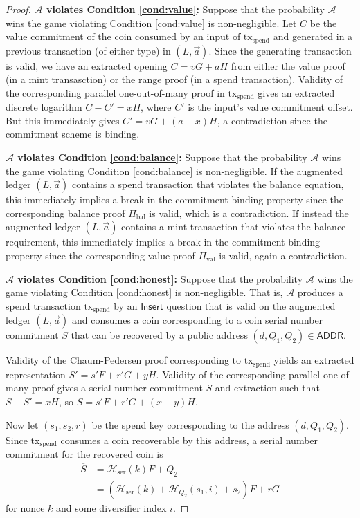 \documentclass{llncs}
\newcommand{\hash}{\mathcal{H}}
\newcommand{\func}[1]{\mathsf{#1}}
\begin{document}
\begin{proof}
\textbf{$\mathcal{A}$ violates Condition \ref{cond:value}:} Suppose that the probability $\mathcal{A}$ wins the game violating Condition \ref{cond:value} is non-negligible.
Let $C$ be the value commitment of the coin consumed by an input of $\text{tx}_{\text{spend}}$ and generated in a previous transaction (of either type) in $(L, \vec{a})$.
Since the generating transaction is valid, we have an extracted opening $C = vG + aH$ from either the value proof (in a mint transasction) or the range proof (in a spend transaction).
Validity of the corresponding parallel one-out-of-many proof in $\text{tx}_{\text{spend}}$ gives an extracted discrete logarithm $C - C' = xH$, where $C'$ is the input's value commitment offset.
But this immediately gives $C' = vG + (a - x)H$, a contradiction since the commitment scheme is binding.

\textbf{$\mathcal{A}$ violates Condition \ref{cond:balance}:} Suppose that the probability $\mathcal{A}$ wins the game violating Condition \ref{cond:balance} is non-negligible.
If the augmented ledger $(L, \vec{a})$ contains a spend transaction that violates the balance equation, this immediately implies a break in the commitment binding property since the corresponding balance proof $\Pi_{\text{bal}}$ is valid, which is a contradiction.
If instead the augmented ledger $(L, \vec{a})$ contains a mint transaction that violates the balance requirement, this immediately implies a break in the commitment binding property since the corresponding value proof $\Pi_{\text{val}}$ is valid, again a contradiction.

\textbf{$\mathcal{A}$ violates Condition \ref{cond:honest}:} Suppose that the probability $\mathcal{A}$ wins the game violating Condition \ref{cond:honest} is non-negligible.
That is, $\mathcal{A}$ produces a spend transaction $\text{tx}_{\text{spend}}$ by an $\func{Insert}$ question that is valid on the augmented ledger $(L, \vec{a})$ and consumes a coin corresponding to a coin serial number commitment $S$ that can be recovered by a public address $(d, Q_1, Q_2) \in \func{ADDR}$.

Validity of the Chaum-Pedersen proof corresponding to $\text{tx}_{\text{spend}}$ yields an extracted representation $S' = s'F + r'G + yH$.
Validity of the corresponding parallel one-of-many proof gives a serial number commitment $S$ and extraction such that $S - S' = xH$, so $S = s'F + r'G + (x + y)H$.

Now let $(s_1,s_2,r)$ be the spend key corresponding to the address $(d,Q_1,Q_2)$.
Since $\text{tx}_{\text{spend}}$ consumes a coin recoverable by this address, a serial number commitment for the recovered coin is
\begin{align*}
\overline{S} &= \hash_{\text{ser}}(k)F + Q_2 \\
&= (\hash_{\text{ser}}(k) + \hash_{Q_2}(s_1,i) + s_2)F + rG
\end{align*}
for nonce $k$ and some diversifier index $i$.


\end{proof}
\end{document}
